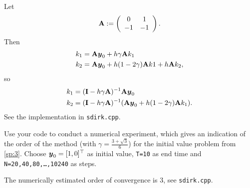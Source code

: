 \begin{problem}
\begin{subproblem}[1]
\cprotEnv \begin{solution}
Let
\[
	{\mathbf{A}}:=\left(\begin{array}{c c}0&1\\-1&-1\end{array}\right).
\]
Then
\begin{align*}
k_1&= {\mathbf{A}} {\boldsymbol{y}}_0+h\gamma{\mathbf{A}} k_1\\
k_2&= {\mathbf{A}}{\boldsymbol{y}}_0+h(1-2\gamma){\mathbf{A}} k1+h{\mathbf{A}} k_2,
\end{align*}
so
\begin{align*}
k_1&= ({\mathbf{I}}-h\gamma{\mathbf{A}})^{-1} {\mathbf{A}} {\boldsymbol{y}}_0\\
k_2&= ({\mathbf{I}}-h\gamma{\mathbf{A}})^{-1}({\mathbf{A}}{\boldsymbol{y}}_0+h(1-2\gamma){\mathbf{A}} k_1).
\end{align*}
See the implementation in \verb|sdirk.cpp|.
% 
\end{solution}

\end{subproblem}

\begin{subproblem}[1]\label{sp:5}
  Use your \Cpp{} code to conduct a numerical experiment, which gives an
  indication of the order of the method (with $\gamma=\frac{3+\sqrt{3}}{6}$) for
  the initial value problem from \autoref{sp:3}.  Choose ${\boldsymbol{y}}_0=[1,0]^\top$ as
  initial value, \texttt{T=10} as end time and \texttt{N=20,40,80,\dots,10240} as
  steps.
	
\cprotEnv \begin{solution}
The numerically estimated order of convergence is $3$, see \verb|sdirk.cpp|.
\end{solution}
\end{subproblem}
	
% 

\end{problem}
%

%
